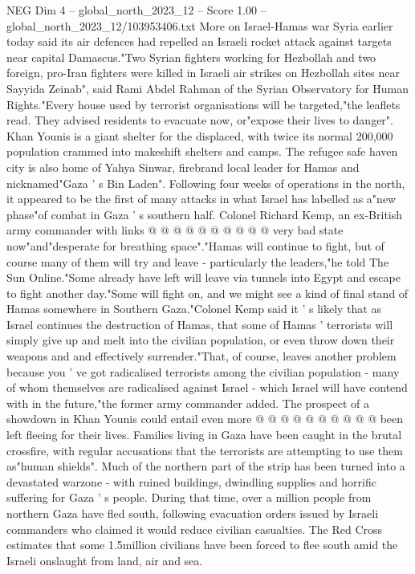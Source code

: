 \begin{textsample}{NEG Dim 4 – global\_north\_2023\_12 – Score 1.00 – global\_north\_2023\_12/103953406.txt}  \label{ex:f4_neg_144}
More on Israel-Hamas war Syria earlier today said its air defences had repelled an Israeli rocket attack against targets near capital Damascus."Two Syrian fighters working for Hezbollah and two foreign, pro-Iran fighters were killed in Israeli air strikes on Hezbollah sites near Sayyida Zeinab", said Rami Abdel Rahman of the Syrian Observatory for Human Rights."Every house used by terrorist organisations will be targeted,"the leaflets read.
They advised residents to evacuate now, or"expose their lives to danger".
Khan Younis is a giant shelter for the displaced, with twice its normal 200,000 population crammed into makeshift shelters and camps.
The refugee safe haven city is also home of Yahya Sinwar, firebrand local leader for Hamas and nicknamed"Gaza ' s Bin Laden".
Following four weeks of operations in the north, it appeared to be the first of many attacks in what Israel has labelled as a"new phase"of combat in Gaza ' s southern half.
Colonel Richard Kemp, an ex-British army commander with links @ @ @ @ @ @ @ @ @ @ very bad state now"and"desperate for breathing space"."Hamas will continue to fight, but of course many of them will try and leave - particularly the leaders,"he told The Sun Online."Some already have left will leave via tunnels into Egypt and escape to fight another day."Some will fight on, and we might see a kind of final stand of Hamas somewhere in Southern Gaza."Colonel Kemp said it ' s likely that as Israel continues the destruction of Hamas, that some of Hamas ' terrorists will simply give up and melt into the civilian population, or even throw down their weapons and and effectively surrender."That, of course, leaves another problem because you ' ve got radicalised terrorists among the civilian population - many of whom themselves are radicalised against Israel - which Israel will have contend with in the future,"the former army commander added.
The prospect of a showdown in Khan Younis could entail even more @ @ @ @ @ @ @ @ @ @ been left fleeing for their lives.
Families living in Gaza have been caught in the brutal crossfire, with regular accusations that the terrorists are attempting to use them as"human shields".
Much of the northern part of the strip has been turned into a devastated warzone - with ruined buildings, dwindling supplies and horrific suffering for Gaza ' s people.
During that time, over a million people from northern Gaza have fled south, following evacuation orders issued by Israeli commanders who claimed it would reduce civilian casualties.
The Red Cross estimates that some 1.5million civilians have been forced to flee south amid the Israeli onslaught from land, air and sea.

\end{textsample}
